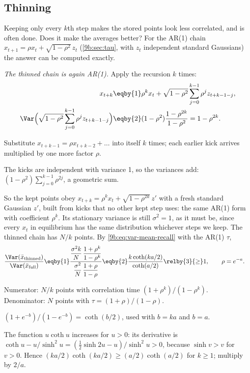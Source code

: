 \subsection{Thinning}
\label{9b:sec:thinning}

Keeping only every $k$th step makes the stored points look less correlated, and is often done.
Does it make the averages better? For the AR(1) chain $x_{t+1}=\rho x_t+\sqrt{1-\rho^2}\,z_t$
(\cref{9b:sec:tau}, with $z_t$ independent standard Gaussians) the answer can be computed exactly.

\emph{The thinned chain is again AR(1).} Apply the recursion $k$ times:
\begin{align*}
  x_{t+k}
  &\eqby{1}\rho^k x_t+\sqrt{1-\rho^2}\sum_{j=0}^{k-1}\rho^j z_{t+k-1-j},
  \\
  \Var\Bigl(\sqrt{1-\rho^2}\sum_{j=0}^{k-1}\rho^j z_{t+k-1-j}\Bigr)
  &\eqby{2}(1-\rho^2)\frac{1-\rho^{2k}}{1-\rho^2}=1-\rho^{2k}.
\end{align*}
\begin{explain}
  \item Substitute $x_{t+k-1}=\rho x_{t+k-2}+\dots$ into itself $k$ times; each earlier kick
        arrives multiplied by one more factor $\rho$.
  \item The kicks are independent with variance 1, so the variances add:
        $(1-\rho^2)\sum_{j=0}^{k-1}\rho^{2j}$, a geometric sum.
\end{explain}
So the kept points obey $x_{t+k}=\rho^kx_t+\sqrt{1-\rho^{2k}}\,z'$ with a fresh standard Gaussian
$z'$, built from kicks that no other kept step uses: the same AR(1) form with coefficient
$\rho^k$. Its stationary variance is still $\sigma^2=1$, as it must be, since every $x_t$ in
equilibrium has the same distribution whichever steps we keep. The thinned chain has $N/k$
points. By \eqref{9b:eq:var-mean-recall} with the AR(1) $\tau$,
\begin{align}
  \frac{\Var(\bar x_{\rm thinned})}{\Var(\bar x_{\rm full})}
  &\eqby{1}\frac{\dfrac{\sigma^2k}{N}\,\dfrac{1+\rho^k}{1-\rho^k}}
            {\dfrac{\sigma^2}{N}\,\dfrac{1+\rho}{1-\rho}}
   \eqby{2}\frac{k\coth(ka/2)}{\coth(a/2)}
   \relby{3}{\ge}1,
   \qquad \rho=e^{-a}.
  \label{9b:eq:thinning}
\end{align}
\begin{explain}
  \item Numerator: $N/k$ points with correlation time $(1+\rho^k)/(1-\rho^k)$. Denominator: $N$
        points with $\tau=(1+\rho)/(1-\rho)$.
  \item $(1+e^{-b})/(1-e^{-b})=\coth(b/2)$, used with $b=ka$ and $b=a$.
  \item The function $u\coth u$ increases for $u>0$: its derivative is
        $\coth u-u/\sinh^2u=(\tfrac12\sinh2u-u)/\sinh^2u>0$, because $\sinh v>v$ for $v>0$. Hence
        $(ka/2)\coth(ka/2)\ge(a/2)\coth(a/2)$ for $k\ge1$; multiply by $2/a$.
\end{explain}
